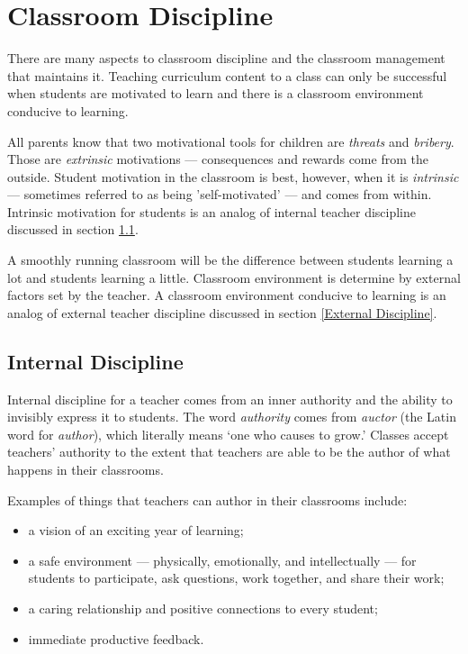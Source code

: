 \documentclass[11pt,twocolumn]{article}%
\def\foreign{\em}
\begin{document}
\section{Classroom Discipline}
\label{Classroom Discipline}

There are many aspects to classroom discipline and the classroom
management that maintains it. Teaching curriculum content to a class
can only be successful when students are motivated to learn and
there is a classroom environment conducive to learning.

All parents know that two motivational tools for children are {\em
threats} and {\em bribery}. Those are {\em extrinsic} motivations
--- consequences and rewards come from the outside. Student motivation
in the classroom is best, however, when it is {\em intrinsic} ---
sometimes referred to as being 'self-motivated' --- and comes from
within. Intrinsic motivation for students is an analog of internal
teacher discipline discussed in section \ref{Internal Discipline}.

A smoothly running classroom will be the difference between students
learning a lot and students learning a little. Classroom environment
is determine by external factors set by the teacher. A classroom
environment conducive to learning is an analog of external teacher
discipline discussed in section \ref{External Discipline}.

\subsection{Internal Discipline}
\label{Internal Discipline}

Internal discipline for a teacher comes from an inner authority and
the ability to invisibly express it to students. The word {\em
authority} comes from {\foreign auctor} (the Latin word for {\em
author}), which literally means `one who causes to grow.' Classes
accept teachers' authority to the extent that teachers are able to
be the author of what happens in their classrooms.

Examples of things that teachers can author in their classrooms
include:
\begin{itemize}
 \item a vision of an exciting year of learning;
 \item a safe environment --- physically, emotionally, and intellectually ---
 for students to participate, ask questions, work together, and share their
 work;
 \item a caring relationship and positive connections to every student;
 \item immediate productive feedback.
\end{itemize}
\end{document}
